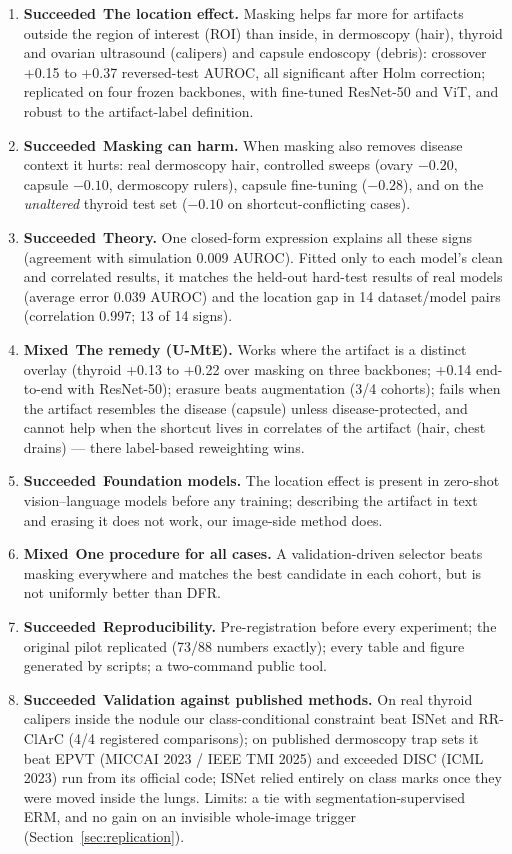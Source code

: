 \documentclass[11pt,a4paper]{article}
\newcommand{\ok}{\textcolor{green!50!black}{\textbf{Succeeded}}}
\newcommand{\mixed}{\textcolor{orange!80!black}{\textbf{Mixed}}}
\begin{document}
\begin{enumerate}[leftmargin=*]
\item \ok\ \textbf{The location effect.} Masking helps far more for artifacts outside the region of interest (ROI)
than inside, in dermoscopy (hair), thyroid and ovarian ultrasound (calipers) and capsule endoscopy (debris): crossover
+0.15 to +0.37 reversed-test AUROC, all significant after Holm correction; replicated on four frozen backbones,
with fine-tuned ResNet-50 and ViT, and robust to the artifact-label definition.
\item \ok\ \textbf{Masking can harm.} When masking also removes disease context it hurts: real dermoscopy hair,
controlled sweeps (ovary $-0.20$, capsule $-0.10$, dermoscopy rulers), capsule fine-tuning ($-0.28$), and on the
\emph{unaltered} thyroid test set ($-0.10$ on shortcut-conflicting cases).
\item \ok\ \textbf{Theory.} One closed-form expression explains all these signs (agreement with simulation 0.009 AUROC).
Fitted only to each model's clean and correlated results, it matches the held-out hard-test results of real models
(average error 0.039 AUROC) and the location gap in 14 dataset/model pairs (correlation 0.997; 13 of 14 signs).
\item \mixed\ \textbf{The remedy (U-MtE).} Works where the artifact is a distinct overlay (thyroid +0.13 to +0.22
over masking on three backbones; +0.14 end-to-end with ResNet-50); erasure beats augmentation (3/4 cohorts); fails when
the artifact resembles the disease (capsule) unless disease-protected, and cannot help when the shortcut lives in
correlates of the artifact (hair, chest drains) --- there label-based reweighting wins.
\item \ok\ \textbf{Foundation models.} The location effect is present in zero-shot vision--language models before any
training; describing the artifact in text and erasing it does not work, our image-side method does.
\item \mixed\ \textbf{One procedure for all cases.} A validation-driven selector beats masking everywhere and matches
the best candidate in each cohort, but is not uniformly better than DFR.
\item \ok\ \textbf{Reproducibility.} Pre-registration before every experiment; the original pilot replicated (73/88
numbers exactly); every table and figure generated by scripts; a two-command public tool.
\item \ok\ \textbf{Validation against published methods.} On real thyroid calipers inside the nodule our
class-conditional constraint beat ISNet and RR-ClArC (4/4 registered comparisons); on published dermoscopy trap sets it
beat EPVT (MICCAI 2023 / IEEE TMI 2025) and exceeded DISC (ICML 2023) run from its official code; ISNet relied entirely on
class marks once they were moved inside the lungs. Limits: a tie with segmentation-supervised ERM, and no gain on an
invisible whole-image trigger (Section~\ref{sec:replication}).
\end{enumerate}
\end{document}
